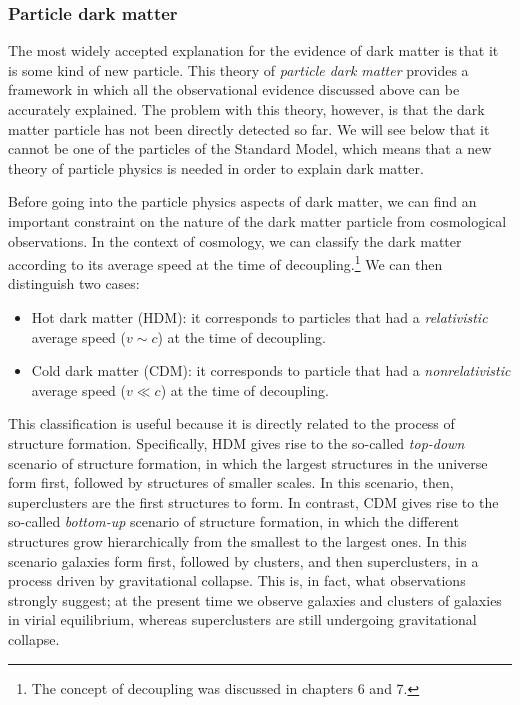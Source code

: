 \subsubsection{Particle dark matter}

The most widely accepted explanation for the evidence of dark matter is that it is some kind of new particle. This theory of {\it particle dark matter} provides a framework in which all the observational evidence discussed above can be accurately explained. The problem with this theory, however, is that the dark matter particle has not been directly detected so far. We will see below that it cannot be one of the particles of the Standard Model, which means that a new theory of particle physics is needed in order to explain dark matter.

Before going into the particle physics aspects of dark matter, we can find an important constraint on the nature of the dark matter particle from cosmological observations. In the context of cosmology, we can classify the dark matter according to its average speed at the time of decoupling.\footnote{The concept of decoupling was discussed in chapters 6 and 7.} We can then distinguish two cases:
\begin{itemize}
\item Hot dark matter (HDM): it corresponds to particles that had a {\it relativistic} average speed ($v\sim c$) at the time of decoupling.
\item Cold dark matter (CDM): it corresponds to particle that had a {\it nonrelativistic} average speed ($v\ll c$) at the time of decoupling.
\end{itemize}
This classification is useful because it is directly related to the process of structure formation. Specifically, HDM gives rise to the so-called {\it top-down} scenario of structure formation, in which the largest structures in the universe form first, followed by structures of smaller scales. In this scenario, then, superclusters are the first structures to form. In contrast, CDM gives rise to the so-called {\it bottom-up} scenario of structure formation, in which the different structures grow hierarchically from the smallest to the largest ones. In this scenario galaxies form first, followed by clusters, and then superclusters, in a process driven by gravitational collapse. This is, in fact, what observations strongly suggest; at the present time we observe galaxies and clusters of galaxies in virial equilibrium, whereas superclusters are still undergoing gravitational collapse.

